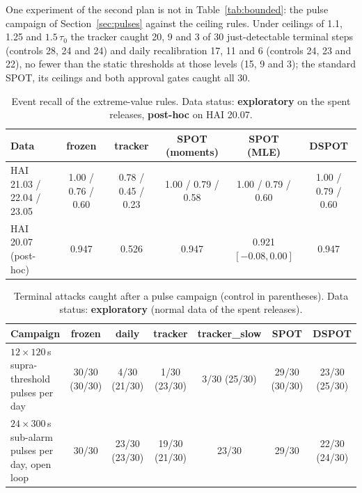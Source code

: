 \documentclass[sigconf]{acmart}
\begin{document}
One experiment of the second plan is not in Table~\ref{tab:bounded}: the pulse campaign of
Section~\ref{sec:pulses} against the ceiling rules. Under ceilings of 1.1, 1.25 and $1.5\,\tau_0$ the
tracker caught 20, 9 and 3 of 30 just-detectable terminal steps (controls 28, 24 and 24) and daily
recalibration 17, 11 and 6 (controls 24, 23 and 22), no fewer than the static thresholds at those
levels (15, 9 and 3); the standard SPOT, its ceilings and both approval gates caught all 30.

\begin{table}[t]
\caption{Event recall of the extreme-value rules. Data status: \textbf{exploratory} on the spent
releases, \textbf{post-hoc} on HAI 20.07.}
\label{tab:evt}
\begin{tabularx}{\textwidth}{@{}Lccccc@{}}
\toprule
Data & frozen & tracker & SPOT (moments) & SPOT (MLE) & DSPOT \\
\midrule
HAI 21.03 / 22.04 / 23.05 & 1.00 / 0.76 / 0.60 & 0.78 / 0.45 / 0.23 & 1.00 / 0.79 / 0.58 & 1.00 / 0.79 / 0.60 & 1.00 / 0.79 / 0.60 \\
HAI 20.07 (post-hoc) & 0.947 & 0.526 & 0.947 & 0.921 $[-0.08, 0.00]$ & 0.947 \\
\bottomrule
\end{tabularx}
\end{table}

\begin{table}[t]
\caption{Terminal attacks caught after a pulse campaign (control in parentheses). Data status:
\textbf{exploratory} (normal data of the spent releases).}
\label{tab:pulses}
\begin{tabularx}{\textwidth}{@{}Lcccccc@{}}
\toprule
Campaign & frozen & daily & tracker & tracker\_slow & SPOT & DSPOT \\
\midrule
$12 \times 120$\,s supra-threshold pulses per day & 30/30 (30/30) & 4/30 (21/30) & 1/30 (23/30) & 3/30 (25/30) & 29/30 (30/30) & 23/30 (25/30) \\
$24 \times 300$\,s sub-alarm pulses per day, open loop & 30/30 & 23/30 (23/30) & 19/30 (21/30) & 23/30 & 29/30 & 22/30 (24/30) \\
\bottomrule
\end{tabularx}
\end{table}
\end{document}
